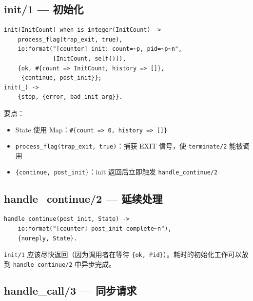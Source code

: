 \documentclass[a4paper,11pt]{article}
\begin{document}
\subsection{init/1 --- 初始化}

\begin{lstlisting}[style=erlangstyle, caption={init/1 --- 初始化回调}]
init(InitCount) when is_integer(InitCount) ->
    process_flag(trap_exit, true),
    io:format("[counter] init: count=~p, pid=~p~n",
              [InitCount, self()]),
    {ok, #{count => InitCount, history => []},
     {continue, post_init}};
init(_) ->
    {stop, {error, bad_init_arg}}.
\end{lstlisting}

要点：
\begin{itemize}[leftmargin=2em]
    \item State 使用 Map：\texttt{\#\{count => 0, history => []\}}
    \item \texttt{process\_flag(trap\_exit, true)}：捕获 EXIT 信号，使 \texttt{terminate/2} 能被调用
    \item \texttt{\{continue, post\_init\}}：init 返回后立即触发 \texttt{handle\_continue/2}
\end{itemize}

\subsection{handle\_continue/2 --- 延续处理}

\begin{lstlisting}[style=erlangstyle, caption={handle\_continue/2 --- 初始化后的延续}]
handle_continue(post_init, State) ->
    io:format("[counter] post_init complete~n"),
    {noreply, State}.
\end{lstlisting}

\begin{tipbox}
\texttt{init/1} 应该尽快返回（因为调用者在等待 \texttt{\{ok, Pid\}}）。耗时的初始化工作可以放到 \texttt{handle\_continue/2} 中异步完成。
\end{tipbox}

\subsection{handle\_call/3 --- 同步请求}
\end{document}
